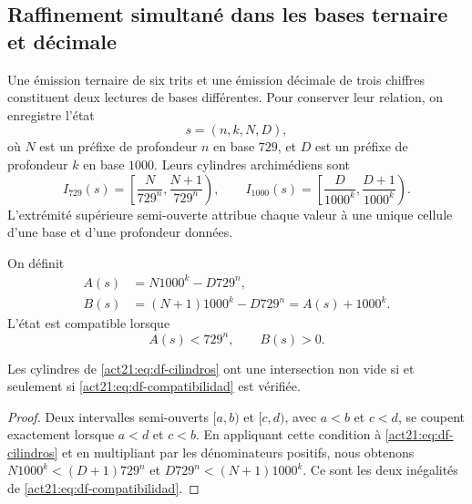 \subsection{Raffinement simultané dans les bases ternaire et décimale}
\label{act21:subsec:df-cilindros-mixtos}


Une émission ternaire de six trits et une émission décimale de trois chiffres
constituent deux lectures de bases différentes. Pour conserver leur relation, on
enregistre l'état
\[
 s=(n,k,N,D),
\]
où \(N\) est un préfixe de profondeur \(n\) en base \(729\), et \(D\) est
un préfixe de profondeur \(k\) en base \(1000\). Leurs cylindres
archimédiens sont
\begin{equation}
 I_{729}(s)=\left[\frac{N}{729^n},\frac{N+1}{729^n}\right),\qquad
 I_{1000}(s)=\left[\frac{D}{1000^k},\frac{D+1}{1000^k}\right).
 \label{act21:eq:df-cilindros}
\end{equation}
L'extrémité supérieure semi-ouverte attribue chaque valeur à une unique cellule d'une base et d'une profondeur données.

\begin{definition}
On définit
\begin{align}
 A(s)&=N1000^k-D729^n,\label{act21:eq:df-defecto-inferior}\\
 B(s)&=(N+1)1000^k-D729^n=A(s)+1000^k.
 \label{act21:eq:df-defecto-superior}
\end{align}
L'état est compatible lorsque
\begin{equation}
 A(s)<729^n,\qquad B(s)>0.
 \label{act21:eq:df-compatibilidad}
\end{equation}
\end{definition}

\begin{lemma}
Les cylindres de \eqref{act21:eq:df-cilindros} ont une intersection non vide si et
seulement si \eqref{act21:eq:df-compatibilidad} est vérifiée.
\end{lemma}

\begin{proof}
Deux intervalles semi-ouverts \([a,b)\) et \([c,d)\), avec \(a<b\) et
\(c<d\), se coupent exactement lorsque \(a<d\) et \(c<b\). En appliquant cette
condition à \eqref{act21:eq:df-cilindros} et en multipliant par les dénominateurs
positifs, nous obtenons
\(N1000^k<(D+1)729^n\) et
\(D729^n<(N+1)1000^k\). Ce sont les deux inégalités de
\eqref{act21:eq:df-compatibilidad}.
\end{proof}

